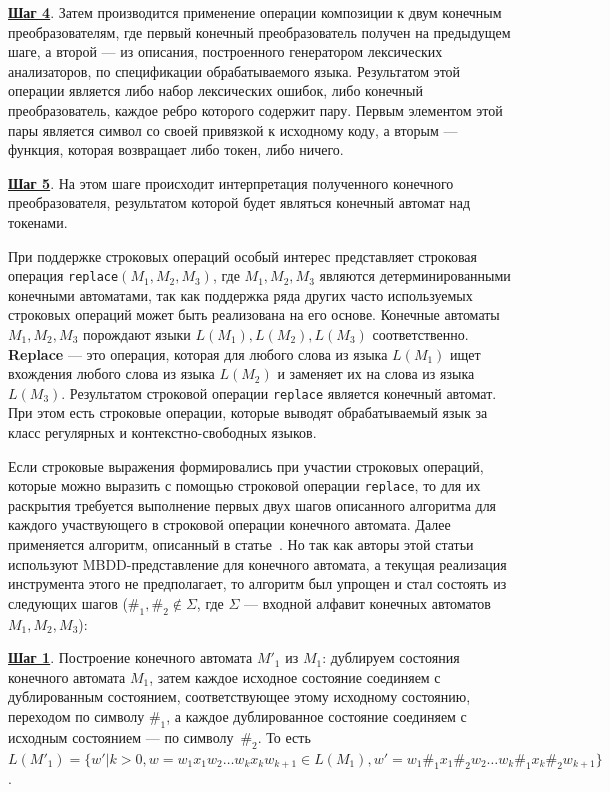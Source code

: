 \textbf{\underline{Шаг 4}}. Затем производится применение операции композиции к двум конечным преобразователям, где первый конечный преобразователь получен на предыдущем шаге, а второй {---} из описания, построенного генератором лексических анализаторов, по спецификации обрабатываемого языка. Результатом этой операции является либо набор лексических ошибок, либо конечный преобразователь, каждое ребро которого содержит пару. Первым элементом этой пары является символ со своей привязкой к исходному коду, а вторым {---} функция, которая возвращает либо токен, либо ничего.

\textbf{\underline{Шаг 5}}. На этом шаге происходит интерпретация полученного конечного преобразователя, результатом которой будет являться конечный автомат над токенами.

При поддержке строковых операций особый интерес представляет строковая операция \verb|replace|$(M_1, M_2, M_3)$, где $M_1, M_2, M_3$ являются детерминированными конечными автоматами, так как поддержка ряда других часто используемых строковых операций может быть реализована на его основе. Конечные автоматы $M_1, M_2, M_3$ порождают языки $L(M_1), L(M_2), L(M_3)$ соответственно. \textbf{Replace} --- это операция, которая для любого слова из языка $L(M_1)$ ищет вхождения любого слова из языка $L(M_2)$ и заменяет их на слова из языка $L(M_3)$. Результатом строковой операции \verb|replace| является конечный автомат. При этом есть строковые операции, которые выводят обрабатываемый язык за класс регулярных и контекстно-свободных языков. 

Если строковые выражения формировались при участии строковых операций, которые можно выразить с помощью строковой операции \verb|replace|, то для их раскрытия требуется выполнение первых двух шагов описанного алгоритма для каждого участвующего в строковой операции конечного автомата. Далее применяется алгоритм, описанный в статье~\cite{ReplaceFangYu}. Но так как авторы этой статьи используют MBDD-представление для конечного автомата, а текущая реализация инструмента этого не предполагает, то алгоритм был упрощен и стал состоять из следующих шагов ($\#_1, \#_2 \notin \Sigma$, где $\Sigma$ --- входной алфавит конечных автоматов $M_1, M_2, M_3$): 

\textbf{\underline{Шаг 1}}. Построение конечного автомата $M'_1$ из $M_1$: дублируем состояния конечного автомата $M_1$, затем каждое исходное состояние соединяем с дублированным состоянием, соответствующее этому исходному состоянию, переходом по символу $\#_1$, а каждое дублированное состояние соединяем с исходным состоянием --- по символу~$\#_2$. То есть $L(M'_1) = \{ w' | k > 0, w =  w_{1}x_{1}w_{2}\ldots w_{k}x_{k}w_{k+1} \in L(M_1), w' = w_{1}\#_{1}x_{1}\#_{2}w_{2}\ldots w_{k}\#_{1}x_{k}\#_{2}w_{k+1}\}$.

